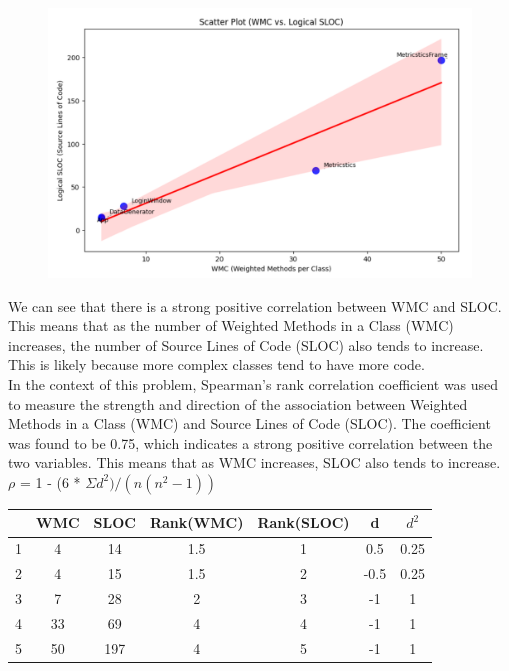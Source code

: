 {{\label{sec: Figure 13}
\begin{figure}[htp]
    \centering
    \includegraphics[width=16cm]{p13.png}
    \label{fig:Figure 13}
\end{figure}

\normalsize{We can see that there is a strong positive correlation between WMC and SLOC. This means that as the number of Weighted Methods in a Class (WMC) increases, the number of Source Lines of Code (SLOC) also tends to increase. This is likely because more complex classes tend to have more code.\linebreak \\
In the context of this problem, Spearman's rank correlation coefficient was used to measure the strength and direction of the association between Weighted Methods in a Class (WMC) and Source Lines of Code (SLOC). The coefficient was found to be 0.75, which indicates a strong positive correlation between the two variables. This means that as WMC increases, SLOC also tends to increase.\linebreak \\}
\normalsize{$\rho$ = 1 - (6 * $\Sigma d^{2})/(n(n^{2} - 1))$ \linebreak}

\begin{table}[H]
    \RaggedRight
\begin{tabular}{|c|c|c|c|c|c|c|} \hline
     & WMC & SLOC & Rank(WMC) & Rank(SLOC) & d & $d^{2}$ \\ \hline
    1 & 4 & 14 & 1.5 & 1 & 0.5 & 0.25 \\ \hline
    2 & 4 & 15 & 1.5 & 2 & -0.5 & 0.25 \\ \hline
    3 & 7 & 28 & 2 & 3 & -1 & 1 \\ \hline
    4 & 33 & 69 & 4 & 4 & -1 & 1 \\ \hline
    5 & 50 & 197 & 4 & 5 & -1 & 1 \\ \hline
\end{tabular}
\end{table}

}}
